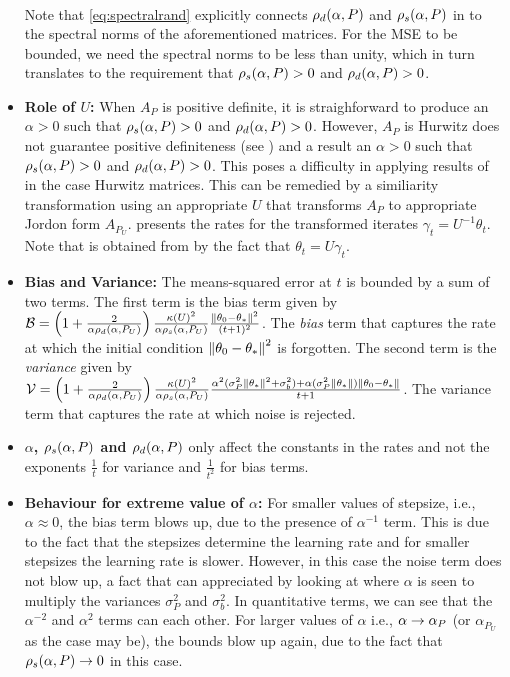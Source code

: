 \begin{itemize}[leftmargin=*, before = \leavevmode\vspace{-\baselineskip}]
\begin{align}
\end{align}
Note that \eqref{eq:spectralrand} explicitly connects $\rho_d(\alpha,P)$ and $\rho_s(\alpha,P)$ in  to the spectral norms of the aforementioned matrices. For the MSE to be bounded, we need the spectral norms to be less than unity, which in turn translates to the requirement that $\rho_s(\alpha,P)>0$ and $\rho_d(\alpha,P)>0$.
\item \textbf{Role of $U$:} When $A_P$ is positive definite, it is straighforward to produce an $\alpha>0$ such that $\rho_s(\alpha,P)>0$ and $\rho_d(\alpha,P)>0$. However, $A_P$ is Hurwitz does not guarantee positive definiteness (see ) and a result an $\alpha>0$ such that $\rho_s(\alpha,P)>0$ and $\rho_d(\alpha,P)>0$. This poses a difficulty in applying results of  in the case Hurwitz matrices. This can be remedied by a similiarity transformation using an appropriate $U$ that transforms $A_P$ to appropriate Jordon form $A_{P_U}$.  presents the rates for the transformed iterates   $\gamma_t=U^{-1 }\theta_t$. Note that  is obtained from  by the fact that $\theta_t=U\gamma_t$.
\item \textbf{Bias and Variance:} The means-squared error at $t$ is bounded by a sum of two terms. The first term is the bias term given by $\mathcal{B}=\left(1+\frac2{\alpha\rho_d(\alpha,P_U)}\right)\frac{\kappa(U)^2}{\alpha \rho_s(\alpha,P_U)}\frac{\left\| \theta_0-\theta_*\right\|^2}{(t+1)^2}$.  The \emph{bias} term that captures the rate at which the initial condition $\left\| \theta_0-\theta_*\right\|^2$ is forgotten. The second term is the \emph{variance} given by $\mathcal{V}=\left(1+\frac2{\alpha\rho_d(\alpha,P_U)}\right)\frac{\kappa(U)^2}{\alpha \rho_s(\alpha,P_U)} \frac{\alpha^2(\sigma_P^2\left\| \theta_*\right\|^2+\sigma_b^2)+\alpha (\sigma_P^2\left\| \theta_*\right\|)\left\| \theta_0-\theta_*\right\|}{t+1} $. The variance term that captures the rate at which noise is rejected.
\item \textbf{$\alpha$, $\rho_s(\alpha,P)$ and $\rho_d(\alpha,P)$} only affect the constants in the rates and not the exponents $\frac{1}{t}$ for variance and $\frac{1}{t^2}$ for bias terms.
\item \textbf{Behaviour for extreme value of $\alpha$:} For smaller values of stepsize, i.e., $\alpha\approx 0$, the bias term blows up, due to the presence of $\alpha^{-1}$ term. This is due to the fact that the stepsizes determine the learning rate and for smaller stepsizes the learning rate is slower. However, in this case the noise term does not blow up, a fact that can appreciated by looking at  where $\alpha$ is seen to multiply the variances $\sigma^2_P$ and $\sigma^2_b$. In quantitative terms, we can see that the $\alpha^{-2}$ and $\alpha^2$ terms can each other. For larger values of $\alpha$ i.e., $\alpha\rightarrow \alpha_{P}$ (or $\alpha_{P_U}$ as the case may be), the bounds blow up again, due to the fact that $\rho_s(\alpha,P)\rightarrow 0$ in this case.


\end{itemize}
